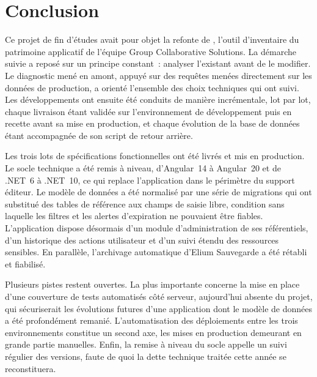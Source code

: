 \chapter*{Conclusion}

Ce projet de fin d'études avait pour objet la refonte de \csbag, l'outil
d'inventaire du patrimoine applicatif de l'équipe Group Collaborative Solutions.
La démarche suivie a reposé sur un principe constant~: analyser l'existant avant
de le modifier. Le diagnostic mené en amont, appuyé sur des requêtes menées
directement sur les données de production, a orienté l'ensemble des choix
techniques qui ont suivi. Les développements ont ensuite été conduits de manière
incrémentale, lot par lot, chaque livraison étant validée sur l'environnement de
développement puis en recette avant sa mise en production, et chaque évolution
de la base de données étant accompagnée de son script de retour arrière.

Les trois lots de spécifications fonctionnelles ont été livrés et mis en
production. Le socle technique a été remis à niveau, d'Angular~14 à Angular~20
et de .NET~6 à .NET~10, ce qui replace l'application dans le périmètre du
support éditeur. Le modèle de données a été normalisé par une série de
migrations qui ont substitué des tables de référence aux champs de saisie libre,
condition sans laquelle les filtres et les alertes d'expiration ne pouvaient
être fiables. L'application dispose désormais d'un module d'administration de
ses référentiels, d'un historique des actions utilisateur et d'un suivi étendu
des ressources sensibles. En parallèle, l'archivage automatique d'Elium
Sauvegarde a été rétabli et fiabilisé.

Plusieurs pistes restent ouvertes. La plus importante concerne la mise en place
d'une couverture de tests automatisés côté serveur, aujourd'hui absente du
projet, qui sécuriserait les évolutions futures d'une application dont le modèle
de données a été profondément remanié. L'automatisation des déploiements entre
les trois environnements constitue un second axe, les mises en production
demeurant en grande partie manuelles. Enfin, la remise à niveau du socle appelle
un suivi régulier des versions, faute de quoi la dette technique traitée cette
année se reconstituera.

